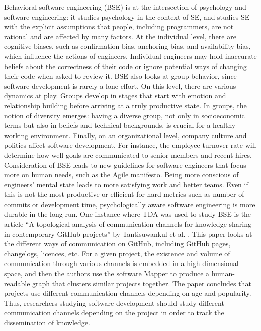\documentclass[11pt, oneside]{article}
\begin{document}
Behavioral software engineering (BSE) is at the intersection of psychology and software engineering: it studies psychology in the context of SE, and studies SE with the explicit assumptions that people, including programmers, are not rational and are affected by many factors. At the individual level, there are cognitive biases, such as confirmation bias, anchoring bias, and availability bias, which influence the actions of engineers. Individual engineers may hold inaccurate beliefs about the correctness of their code or ignore potential ways of changing their code when asked to review it. BSE also looks at group behavior, since software development is rarely a lone effort. On this level, there are various dynamics at play. Groups develop in stages that start with emotion and relationship building before arriving at a truly productive state. In groups, the notion of diversity emerges: having a diverse group, not only in socioeconomic terms but also in beliefs and technical backgrounds, is crucial for a healthy working environment. Finally, on an organizational level, company culture and politics affect software development. For instance, the employee turnover rate will determine how well goals are communicated to senior members and recent hires. Consideration of BSE leads to new guidelines for software engineers that focus more on human needs, such as the Agile manifesto. Being more conscious of engineers’ mental state leads to more satisfying work and better teams. Even if this is not the most productive or efficient for hard metrics such as number of commits or development time, psychologically aware software engineering is more durable in the long run. One instance where TDA was used to study BSE is the article “A topological analysis of communication channels for knowledge sharing in contemporary GitHub projects” by Tantisuwankul et al. \cite{T}. This paper looks at the different ways of communication on GitHub, including GitHub pages, changelogs, licences, etc. For a given project, the existence and volume of communication through various channels is embedded in a high-dimensional space, and then the authors use the software Mapper to produce a human-readable graph that clusters similar projects together. The paper concludes that projects use different communication channels depending on age and popularity. Thus, researchers studying software development should study different communication channels depending on the project in order to track the dissemination of knowledge.
\end{document}
